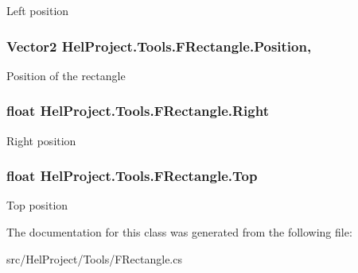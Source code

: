 Left position 

\hypertarget{class_hel_project_1_1_tools_1_1_f_rectangle_a77d6c7b832edfa34e2a4402c400d8e59}{}
\subsubsection[{Position}]{\setlength{\rightskip}{0pt plus 5cm}Vector2 Hel\+Project.\+Tools.\+F\+Rectangle.\+Position\hspace{0.3cm}{\ttfamily [get]}, {\ttfamily [set]}}\label{class_hel_project_1_1_tools_1_1_f_rectangle_a77d6c7b832edfa34e2a4402c400d8e59}


Position of the rectangle 

\hypertarget{class_hel_project_1_1_tools_1_1_f_rectangle_ad758ded56c229a9a801193c0671cd5da}{}
\subsubsection[{Right}]{\setlength{\rightskip}{0pt plus 5cm}float Hel\+Project.\+Tools.\+F\+Rectangle.\+Right\hspace{0.3cm}{\ttfamily [get]}}\label{class_hel_project_1_1_tools_1_1_f_rectangle_ad758ded56c229a9a801193c0671cd5da}


Right position 

\hypertarget{class_hel_project_1_1_tools_1_1_f_rectangle_a40203015f0e458f97ad0f2ba7017da7d}{}
\subsubsection[{Top}]{\setlength{\rightskip}{0pt plus 5cm}float Hel\+Project.\+Tools.\+F\+Rectangle.\+Top\hspace{0.3cm}{\ttfamily [get]}}\label{class_hel_project_1_1_tools_1_1_f_rectangle_a40203015f0e458f97ad0f2ba7017da7d}


Top position 



The documentation for this class was generated from the following file\+:\begin{DoxyCompactItemize}
\item 
src/\+Hel\+Project/\+Tools/F\+Rectangle.\+cs\end{DoxyCompactItemize}
